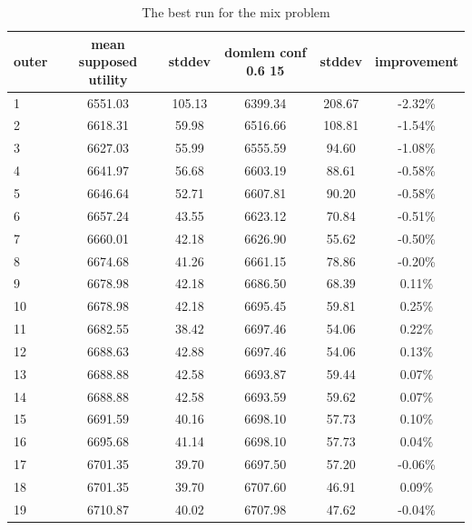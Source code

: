 \begin{table}[htb]
  \centering
  \begin{tabular}{l c c c c c}
    \hline
outer & mean supposed utility & stddev & domlem conf 0.6 15 & stddev & improvement \\
    \hline
    \hline
1 & 6551.03 & 105.13 & 6399.34 & 208.67 & -2.32\% \\
2 & 6618.31 & 59.98 & 6516.66 & 108.81 & -1.54\% \\
3 & 6627.03 & 55.99 & 6555.59 & 94.60 & -1.08\% \\
4 & 6641.97 & 56.68 & 6603.19 & 88.61 & -0.58\% \\
5 & 6646.64 & 52.71 & 6607.81 & 90.20 & -0.58\% \\
6 & 6657.24 & 43.55 & 6623.12 & 70.84 & -0.51\% \\
7 & 6660.01 & 42.18 & 6626.90 & 55.62 & -0.50\% \\
8 & 6674.68 & 41.26 & 6661.15 & 78.86 & -0.20\% \\
9 & 6678.98 & 42.18 & 6686.50 & 68.39 & 0.11\% \\
10 & 6678.98 & 42.18 & 6695.45 & 59.81 & 0.25\% \\
11 & 6682.55 & 38.42 & 6697.46 & 54.06 & 0.22\% \\
12 & 6688.63 & 42.88 & 6697.46 & 54.06 & 0.13\% \\
13 & 6688.88 & 42.58 & 6693.87 & 59.44 & 0.07\% \\
14 & 6688.88 & 42.58 & 6693.59 & 59.62 & 0.07\% \\
15 & 6691.59 & 40.16 & 6698.10 & 57.73 & 0.10\% \\
16 & 6695.68 & 41.14 & 6698.10 & 57.73 & 0.04\% \\
17 & 6701.35 & 39.70 & 6697.50 & 57.20 & -0.06\% \\
18 & 6701.35 & 39.70 & 6707.60 & 46.91 & 0.09\% \\
19 & 6710.87 & 40.02 & 6707.98 & 47.62 & -0.04\% \\
    \hline
  \end{tabular}
  \caption{The best run for the mix problem}
  \label{t:un_best_1}
\end{table}


